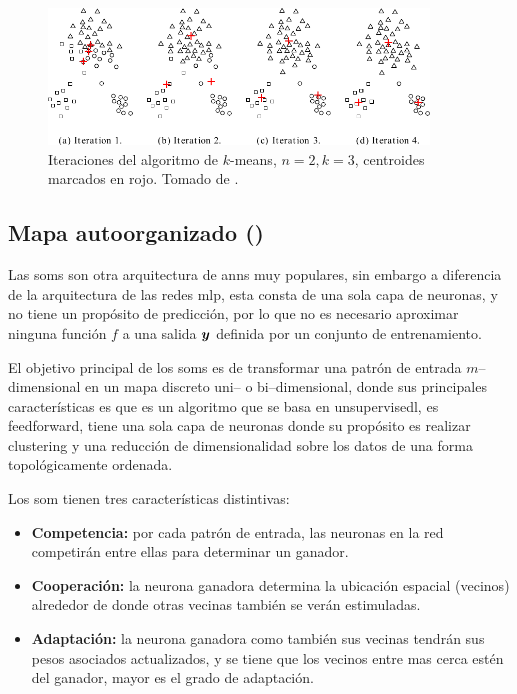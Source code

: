 \begin{figure}[H]
  \centering
  \includegraphics[width=0.9\textwidth]{Figures/k-mean-iteration.pdf}
  \decoRule
  \caption[Iteraciones del algoritmo de $k$-means]{Iteraciones del algoritmo de $k$-means, $n = 2, k = 3$, centroides marcados en rojo. Tomado de \cite{tan2005introduction}.}
  \label{fig:k-means-iterations}
\end{figure}


\subsection{Mapa autoorganizado ()} \label{subsec:SOM}
Las \glspl{som} son otra arquitectura de \glspl{ann} muy populares, sin embargo a diferencia de la arquitectura de las redes \gls{mlp}, esta consta de una sola capa de neuronas, y no tiene un propósito de predicción, por lo que no es necesario aproximar ninguna función $f$ a una salida ${\bm{y}}$ definida por un conjunto de entrenamiento.

El objetivo principal de los \glspl{som} es de transformar una patrón de entrada $m$--dimensional en un mapa discreto uni-- o bi--dimensional, donde sus principales características es que es un algoritmo que se basa en \gls{unsupervisedl}, es \gls{feedforward}, tiene una sola capa de neuronas donde su propósito es realizar \gls{clustering} y una reducción de dimensionalidad sobre los datos de una forma topológicamente ordenada.

Los \gls{som} tienen tres características distintivas:
\begin{itemize}
\item {\bf Competencia:} por cada patrón de entrada, las neuronas en la red competirán entre ellas para determinar un ganador.
\item {\bf Cooperación:} la neurona ganadora determina la ubicación espacial (vecinos) alrededor de donde otras vecinas también se verán estimuladas.
\item {\bf Adaptación:} la neurona ganadora como también sus vecinas tendrán sus pesos asociados actualizados, y se tiene que los vecinos entre mas cerca estén del ganador, mayor es el grado de adaptación.
\end{itemize}

